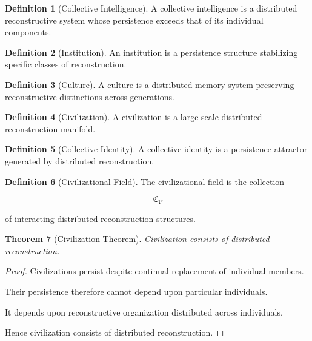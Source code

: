 \documentclass[12pt,oneside]{article}
\newtheorem{theorem}{Theorem}[section] \newtheorem{lemma}[theorem]{Lemma} \newtheorem{proposition}[theorem]{Proposition} \newtheorem{corollary}[theorem]{Corollary}
\theoremstyle{definition}
\newtheorem{definition}[theorem]{Definition} \newtheorem{axiom}[theorem]{Axiom} \newtheorem{remark}[theorem]{Remark} \newtheorem{example}[theorem]{Example}
\begin{document}
\begin{definition}[Collective Intelligence]

A collective intelligence is a distributed reconstructive system whose persistence exceeds that of its individual components.

\end{definition}

\begin{definition}[Institution]

An institution is a persistence structure stabilizing specific classes of reconstruction.

\end{definition}

\begin{definition}[Culture]

A culture is a distributed memory system preserving reconstructive distinctions across generations.

\end{definition}

\begin{definition}[Civilization]

A civilization is a large-scale distributed reconstruction manifold.

\end{definition}

\begin{definition}[Collective Identity]

A collective identity is a persistence attractor generated by distributed reconstruction.

\end{definition}

\begin{definition}[Civilizational Field]

The civilizational field is the collection

\[
\mathfrak C_V
\]

of interacting distributed reconstruction structures.

\end{definition}

\begin{theorem}[Civilization Theorem]

Civilization consists of distributed reconstruction.

\end{theorem}

\begin{proof}

Civilizations persist despite continual replacement of individual members.

Their persistence therefore cannot depend upon particular individuals.

It depends upon reconstructive organization distributed across individuals.

Hence civilization consists of distributed reconstruction.

\end{proof}
\end{document}
